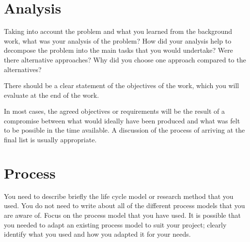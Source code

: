 \section{Analysis}
Taking into account the problem and what you learned from the background work, what was your analysis of the problem? How did your analysis help to decompose the problem into the main tasks that you would undertake? Were there alternative approaches? Why did you choose one approach compared to the alternatives? 

There should be a clear statement of the objectives of the work, which you will evaluate at the end of the work. 

In most cases, the agreed objectives or requirements will be the result of a compromise between what would ideally have been produced and what was felt to be possible in the time available. A discussion of the process of arriving at the final list is usually appropriate.

\section{Process}
You need to describe briefly the life cycle model or research method that you used. You do not need to write about all of the different process models that you are aware of. Focus on the process model that you have used. It is possible that you needed to adapt an existing process model to suit your project; clearly identify what you used and how you adapted it for your needs.

